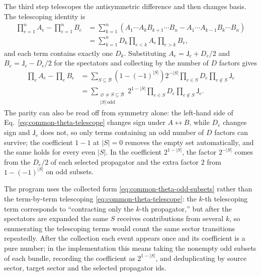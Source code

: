 \documentclass[11pt,a4paper]{article}
\begin{document}
The third step telescopes the antisymmetric difference and then changes basis. The telescoping identity is
\begin{equation}
\begin{split}
 \prod_{e=1}^{n}A_e-\prod_{e=1}^{n}B_e
 &=\sum_{k=1}^{n}\left(A_1\cdots A_kB_{k+1}\cdots B_n
 -A_1\cdots A_{k-1}B_k\cdots B_n\right)\\
 &=\sum_{k=1}^{n}D_k\prod_{e<k}A_e\prod_{e>k}B_e,
\end{split}
 \label{eq:common-theta-telescope}
\end{equation}
and each term contains exactly one $D_k$. Substituting $A_e=\mathsf J_e+D_e/2$ and $B_e=\mathsf J_e-D_e/2$ for the spectators and collecting by the number of $D$ factors gives
\begin{equation}
\begin{split}
 \prod_eA_e-\prod_eB_e
 &=\sum_{S\subseteq\mathcal B}\left(1-(-1)^{|S|}\right)2^{-|S|}
 \prod_{e\in S}D_e\prod_{e\notin S}\mathsf J_e\\
 &=\sum_{\substack{\varnothing\neq S\subseteq\mathcal B\\|S|\ \text{odd}}}
 2^{1-|S|}\prod_{e\in S}D_e\prod_{e\notin S}\mathsf J_e.
\end{split}
 \label{eq:common-theta-odd-subsets}
\end{equation}
The parity can also be read off from symmetry alone: the left-hand side of Eq.~\eqref{eq:common-theta-telescope} changes sign under $A\leftrightarrow B$, while $D_e$ changes sign and $\mathsf J_e$ does not, so only terms containing an odd number of $D$ factors can survive; the coefficient $1-1$ at $|S|=0$ removes the empty set automatically, and the same holds for every even $|S|$. In the coefficient $2^{1-|S|}$, the factor $2^{-|S|}$ comes from the $D_e/2$ of each selected propagator and the extra factor $2$ from $1-(-1)^{|S|}$ on odd subsets.

The program uses the collected form \eqref{eq:common-theta-odd-subsets} rather than the term-by-term telescoping \eqref{eq:common-theta-telescope}: the $k$-th telescoping term corresponds to ``contracting only the $k$-th propagator,'' but after the spectators are expanded the same $S$ receives contributions from several $k$, so enumerating the telescoping terms would count the same sector transitions repeatedly. After the collection each event appears once and its coefficient is a pure number; in the implementation this means taking the nonempty odd subsets of each bundle, recording the coefficient as $2^{1-|S|}$, and deduplicating by source sector, target sector and the selected propagator ids.
\end{document}
